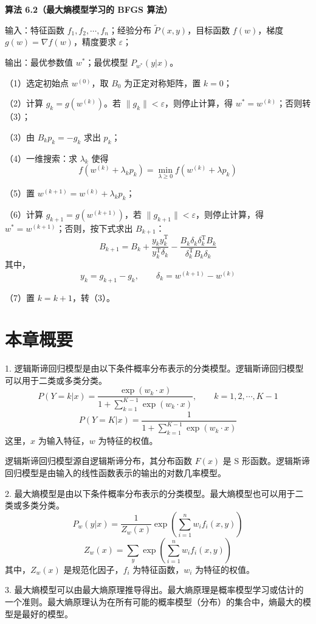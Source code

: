 \documentclass[UTF8, 12pt, fontset=fandol, oneside]{ctexart}
\begin{document}
\noindent\textbf{算法 6.2（最大熵模型学习的 BFGS 算法）}\quad

输入：特征函数 $f_1,f_2,\cdots,f_n$；经验分布 $\tilde{P}(x,y)$，目标函数 $f(w)$，梯度 $g(w)=\nabla f(w)$，精度要求 $\varepsilon$；

输出：最优参数值 $w^*$；最优模型 $P_{w^*}(y|x)$。

（1）选定初始点 $w^{(0)}$，取 $B_0$ 为正定对称矩阵，置 $k=0$；

（2）计算 $g_k=g(w^{(k)})$。若 $\|g_k\|<\varepsilon$，则停止计算，得 $w^*=w^{(k)}$；否则转（3）；

（3）由 $B_k p_k=-g_k$ 求出 $p_k$；

（4）一维搜索：求 $\lambda_k$ 使得
\[
f(w^{(k)}+\lambda_k p_k)=\min_{\lambda\geq 0} f(w^{(k)}+\lambda p_k)
\]

（5）置 $w^{(k+1)}=w^{(k)}+\lambda_k p_k$；

（6）计算 $g_{k+1}=g(w^{(k+1)})$，若 $\|g_{k+1}\|<\varepsilon$，则停止计算，得 $w^*=w^{(k+1)}$；否则，按下式求出 $B_{k+1}$：
\[
B_{k+1}=B_k+\frac{y_k y_k^{\mathrm{T}}}{y_k^{\mathrm{T}}\delta_k}
-\frac{B_k\delta_k\delta_k^{\mathrm{T}}B_k}{\delta_k^{\mathrm{T}}B_k\delta_k}
\]
其中，
\[
y_k=g_{k+1}-g_k,\qquad \delta_k=w^{(k+1)}-w^{(k)}
\]

（7）置 $k=k+1$，转（3）。

\section*{本章概要}

1. 逻辑斯谛回归模型是由以下条件概率分布表示的分类模型。逻辑斯谛回归模型可以用于二类或多类分类。
\[
P(Y=k|x)=\frac{\exp(w_k\cdot x)}
{1+\sum_{k=1}^{K-1}\exp(w_k\cdot x)},\qquad k=1,2,\cdots,K-1
\]
\[
P(Y=K|x)=\frac{1}{1+\sum_{k=1}^{K-1}\exp(w_k\cdot x)}
\]
这里，$x$ 为输入特征，$w$ 为特征的权值。

逻辑斯谛回归模型源自逻辑斯谛分布，其分布函数 $F(x)$ 是 S 形函数。逻辑斯谛回归模型是由输入的线性函数表示的输出的对数几率模型。

2. 最大熵模型是由以下条件概率分布表示的分类模型。最大熵模型也可以用于二类或多类分类。
\[
P_w(y|x)=\frac{1}{Z_w(x)}\exp\left(\sum_{i=1}^n w_i f_i(x,y)\right)
\]
\[
Z_w(x)=\sum_y\exp\left(\sum_{i=1}^n w_i f_i(x,y)\right)
\]
其中，$Z_w(x)$ 是规范化因子，$f_i$ 为特征函数，$w_i$ 为特征的权值。

3. 最大熵模型可以由最大熵原理推导得出。最大熵原理是概率模型学习或估计的一个准则。最大熵原理认为在所有可能的概率模型（分布）的集合中，熵最大的模型是最好的模型。
\end{document}
